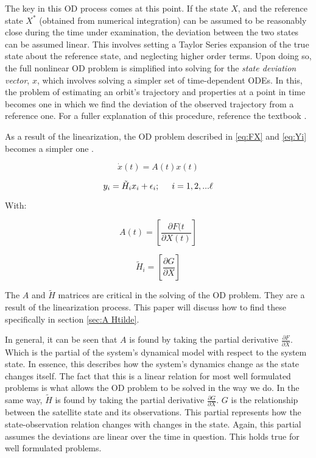 \documentclass[12pt,a4paper,oneside]{article}
\numberwithin{equation}{section}   		%
\newcommand{\brackets} [1] {\left[ #1 \right]}
\begin{document}
The key in this OD process comes at this point. If the state $X$, and the reference state $X^*$ (obtained from numerical integration) can be assumed to be reasonably close during the time under examination, the deviation between the two states can be assumed linear. This involves setting a Taylor Series expansion of the true state about the reference state, and neglecting higher order terms. Upon doing so, the full nonlinear OD problem is simplified into solving for the \emph{state deviation vector}, $x$, which involves solving a simpler set of time-dependent ODEs. In this, the problem of estimating an orbit's trajectory and properties at a point in time becomes one in which we find the deviation of the observed trajectory from a reference one. For a fuller explanation of this procedure, reference the textbook \cite[section 4.2]{tapley2004statistical}.

As a result of the linearization, the OD problem described in \eqref{eq:FX} and \eqref{eq:Yi} becomes a simpler one . 

\begin{equation}
	\dot{x}(t) = A(t)x(t)
	\label{eq:x lin}
\end{equation}

\begin{equation}
	y_i = \tilde{H}_ix_i + \epsilon_i ;     \hspace{0.5cm}   i=1,2,...\ell
	\label{eq:y lin}
\end{equation}

With:

\begin{equation}
	A(t) = \brackets{\frac{\partial F(t}{\partial X(t)}}
	\label{eq:A Lin}
\end{equation}

\begin{equation}
	\tilde{H}_i = \brackets{\frac{\partial G}{\partial X}}
	\label{eq:Htilde Lin}
\end{equation}

The $A$ and $\tilde{H}$ matrices are critical in the solving of the OD problem. They are a result of the linearization process. This paper will discuss how to find these specifically in section \ref{sec:A Htilde}.

In general, it can be seen that $A$ is found by taking the partial derivative $\frac{\partial{F}}{\partial{X}}$. Which is the partial of the system's dynamical model with respect to the system state. In essence, this describes how the system's dynamics change as the state changes itself. The fact that this is a linear relation for most well formulated problems is what allows the OD problem to be solved in the way we do. 
In the same way, $\tilde{H}$ is found by taking the partial derivative $\frac{\partial{G}}{\partial{X}}$. $G$ is the relationship between the satellite state and its observations. This partial represents how the state-observation relation changes with changes in the state. Again, this partial assumes the deviations are linear over the time in question. This holds true for well formulated problems. 
\end{document}
